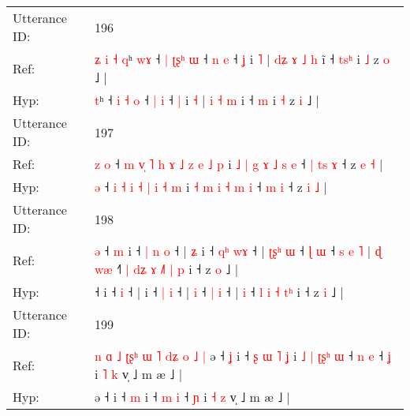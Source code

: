 \documentclass[10pt]{article}
\DeclareRobustCommand{\hl}[1]{{\textcolor{red}{#1}}}
\begin{document}
\begin{longtable}{ll}
 \\
\midrule
Utterance ID: & 196 \\
Ref: & \hl{ʑ}\hl{ }\hl{i}\hl{ }\hl{˧}\hl{ }\hl{q}ʰ\hl{ }\hl{w}\hl{ɤ} ˧ \hl{|} \hl{ʈ}\hl{ʂ}\hl{ʰ} \hl{ɯ} ˧ \hl{n} \hl{e} ˧ \hl{ʝ} i \hl{˥} |\hl{ }\hl{d}\hl{ʑ} \hl{ɤ} \hl{˩} \hl{h} i\hl{̃} ˧ \hl{t}\hl{s}\hl{ʰ} i \hl{˩} z \hl{o} ˩ |
 \\
Hyp: & \hl{}\hl{}\hl{}\hl{}\hl{}\hl{}\hl{t}ʰ\hl{}\hl{}\hl{} ˧ \hl{i} \hl{}\hl{}\hl{˧} \hl{o} ˧ \hl{|} \hl{i} ˧ \hl{|} i \hl{˧} |\hl{}\hl{}\hl{} \hl{i} \hl{˧} \hl{m} i\hl{} ˧ \hl{}\hl{}\hl{m} i \hl{˧} z \hl{i} ˩ |
 \\
\midrule
Utterance ID: & 197 \\
Ref: & \hl{z}\hl{ }\hl{o} ˧\hl{ }\hl{m}\hl{ }\hl{v}\hl{̩} \hl{˥} \hl{h} \hl{ɤ} \hl{˩} \hl{z} \hl{e} \hl{˩} \hl{p} i\hl{ }\hl{˩} \hl{|} \hl{g} \hl{ɤ} \hl{˩} \hl{s} \hl{e} ˧\hl{ }\hl{|} \hl{t}\hl{s} \hl{ɤ} ˧ z \hl{e} \hl{˧} |
 \\
Hyp: & \hl{}\hl{}\hl{ə} ˧\hl{}\hl{}\hl{}\hl{}\hl{} \hl{i} \hl{˧} \hl{i} \hl{˧} \hl{|} \hl{i} \hl{˧} \hl{m} i\hl{}\hl{} \hl{˧} \hl{m} \hl{i} \hl{˧} \hl{m} \hl{i} ˧\hl{}\hl{} \hl{}\hl{m} \hl{i} ˧ z \hl{i} \hl{˩} |
 \\
\midrule
Utterance ID: & 198 \\
Ref: & \hl{ə}\hl{ }˧\hl{ }\hl{m} i ˧\hl{ }\hl{|}\hl{ }\hl{n} \hl{o} ˧ |\hl{ }\hl{ʑ} i ˧ \hl{q}\hl{ʰ} \hl{w}\hl{ɤ} ˧ |\hl{ }\hl{ʈ}\hl{ʂ}\hl{ʰ} \hl{ɯ} ˧ \hl{ɭ} \hl{ɯ} ˧\hl{ }\hl{s}\hl{ }\hl{e}\hl{ }\hl{˥} |\hl{ }\hl{ɖ} \hl{w}\hl{æ} ˧\hl{˥}\hl{ }\hl{|} \hl{d}\hl{ʑ} \hl{ɤ} \hl{˩}\hl{˥} \hl{|}\hl{ }\hl{p} i ˧ z \hl{o} ˩ |
 \\
Hyp: & \hl{}\hl{}˧\hl{}\hl{} i ˧\hl{}\hl{}\hl{}\hl{} \hl{i} ˧ |\hl{}\hl{} i ˧ \hl{}\hl{|} \hl{}\hl{i} ˧ |\hl{}\hl{}\hl{}\hl{} \hl{i} ˧ \hl{|} \hl{i} ˧\hl{}\hl{}\hl{}\hl{}\hl{}\hl{} |\hl{}\hl{} \hl{}\hl{i} ˧\hl{}\hl{}\hl{} \hl{}\hl{l} \hl{i} \hl{}\hl{˧} \hl{}\hl{t}\hl{ʰ} i ˧ z \hl{i} ˩ |
 \\
\midrule
Utterance ID: & 199 \\
Ref: & \hl{n}\hl{ }\hl{ɑ}\hl{ }\hl{˩}\hl{ }\hl{ʈ}\hl{ʂ}\hl{ʰ}\hl{ }\hl{ɯ}\hl{ }\hl{˥}\hl{ }\hl{d}\hl{ʑ}\hl{ }\hl{o}\hl{ }\hl{˩}\hl{ }\hl{|}\hl{ }ə ˧\hl{ }\hl{ʝ} i ˧\hl{ }\hl{ʂ}\hl{ }\hl{ɯ}\hl{ }\hl{˥} \hl{ʝ} i\hl{ }\hl{˩}\hl{ }\hl{|}\hl{ }\hl{ʈ}\hl{ʂ}\hl{ʰ}\hl{ }\hl{ɯ} ˧ \hl{n} \hl{e} ˧ \hl{ʝ} i \hl{˥} \hl{k} v̩ ˩ m æ ˩ |
 \\
Hyp: & \hl{}\hl{}\hl{}\hl{}\hl{}\hl{}\hl{}\hl{}\hl{}\hl{}\hl{}\hl{}\hl{}\hl{}\hl{}\hl{}\hl{}\hl{}\hl{}\hl{}\hl{}\hl{}\hl{}ə ˧\hl{}\hl{} i ˧\hl{}\hl{}\hl{}\hl{}\hl{}\hl{} \hl{m} i\hl{}\hl{}\hl{}\hl{}\hl{}\hl{}\hl{}\hl{}\hl{}\hl{} ˧ \hl{m} \hl{i} ˧ \hl{ɲ} i \hl{˧} \hl{z} v̩ ˩ m æ ˩ |

\end{longtable}
\end{document}
